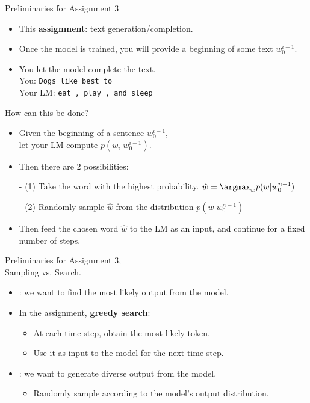 \begin{frame}{Preliminaries for Assignment 3}
\begin{itemize}
\item This \textbf{assignment}: text generation/completion.\\
\item Once the model is trained, you will provide a beginning of some text $w_0^{i-1}$.
\item You let the model complete the text.\\
You: \texttt{Dogs like best to}\\
Your LM: \texttt{eat , play , and sleep}
\end{itemize}
\vsp
\pause
How can this be done?
\pause
\begin{itemize}
\item Given the beginning of a sentence $w_0^{i-1}$,\\
let your LM compute $p(w_i | w_0^{i-1})$.
\item Then there are 2 possibilities:
\item[-] (1) Take the word with the highest probability. $\hat{w} = \argmax_w p(w | w_0^{n-1})$
\item[-] (2) Randomly sample $\hat{w}$ from the distribution $p(w | w_0^{n-1})$
\item Then feed the chosen word $\hat{w}$ to the LM as an input, and continue for a fixed number of steps.
\end{itemize}
\end{frame}

\begin{frame}{Preliminaries for Assignment 3,\\
Sampling vs. Search.}
\begin{itemize}
\item {}: we want to find the most likely output from the model.
\item In the assignment, \textbf{greedy search}:
\begin{itemize}
\item At each time step, obtain the most likely token.
\item Use it as input to the model for the next time step.
\end{itemize}
\item {}: we want to generate diverse output from the model.
\begin{itemize}
\item Randomly sample according to the model's output distribution.
\end{itemize}
\end{itemize}
\end{frame}

